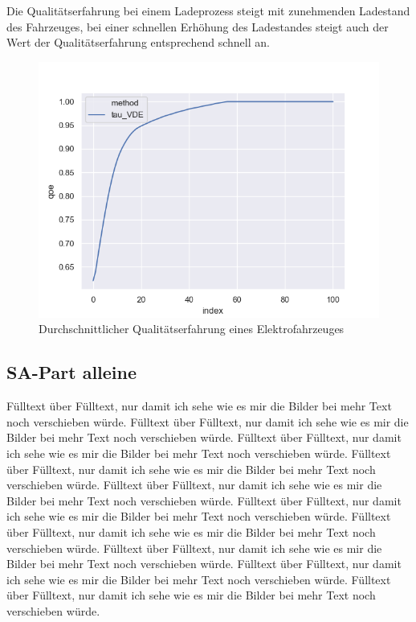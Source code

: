 Die Qualitätserfahrung bei einem Ladeprozess steigt mit zunehmenden Ladestand des Fahrzeuges, bei einer schnellen Erhöhung des Ladestandes steigt auch der Wert der Qualitätserfahrung entsprechend schnell an.\\
\begin{figure}[htb]
\centering
	\includegraphics[scale=0.4]{img/VDE_tau/tau_VDE_2_qoe.png}
	\caption{Durchschnittlicher Qualitätserfahrung eines Elektrofahrzeuges}
	\label{Abb_VDEtauTrafoLast}
\end{figure}

\subsection{SA-Part alleine}
Fülltext über Fülltext, nur damit ich sehe wie es mir die Bilder bei mehr Text noch verschieben würde. Fülltext über Fülltext, nur damit ich sehe wie es mir die Bilder bei mehr Text noch verschieben würde. Fülltext über Fülltext, nur damit ich sehe wie es mir die Bilder bei mehr Text noch verschieben würde. Fülltext über Fülltext, nur damit ich sehe wie es mir die Bilder bei mehr Text noch verschieben würde. Fülltext über Fülltext, nur damit ich sehe wie es mir die Bilder bei mehr Text noch verschieben würde. Fülltext über Fülltext, nur damit ich sehe wie es mir die Bilder bei mehr Text noch verschieben würde. Fülltext über Fülltext, nur damit ich sehe wie es mir die Bilder bei mehr Text noch verschieben würde. Fülltext über Fülltext, nur damit ich sehe wie es mir die Bilder bei mehr Text noch verschieben würde. Fülltext über Fülltext, nur damit ich sehe wie es mir die Bilder bei mehr Text noch verschieben würde. Fülltext über Fülltext, nur damit ich sehe wie es mir die Bilder bei mehr Text noch verschieben würde.
